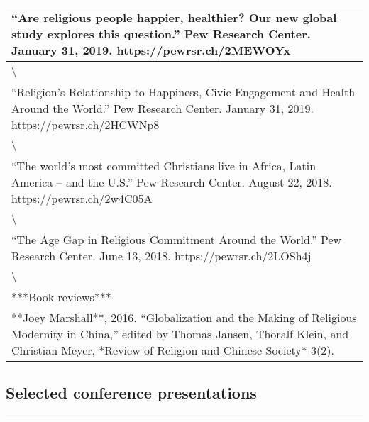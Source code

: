\documentclass[
]{article}
\begin{document}
\begin{tabular}{l}
\hline
“Are religious people happier, healthier? Our new global study explores this question.” Pew Research Center. January 31, 2019. https://pewrsr.ch/2MEWOYx\\
\hline
\textbackslash{}\\
\hline
“Religion’s Relationship to Happiness, Civic Engagement and Health Around the World.” Pew Research Center. January 31, 2019. https://pewrsr.ch/2HCWNp8\\
\hline
\textbackslash{}\\
\hline
“The world’s most committed Christians live in Africa, Latin America – and the U.S.” Pew Research Center. August 22, 2018. https://pewrsr.ch/2w4C05A\\
\hline
\textbackslash{}\\
\hline
“The Age Gap in Religious Commitment Around the World.” Pew Research Center. June 13, 2018. https://pewrsr.ch/2LOSh4j\\
\hline
\textbackslash{}\\
\hline
***Book reviews***\\
\hline
**Joey Marshall**, 2016. “Globalization and the Making of Religious Modernity in China,” edited by Thomas Jansen, Thoralf Klein, and Christian Meyer, *Review of Religion and Chinese Society* 3(2).\\
\hline
\end{tabular}

\hypertarget{selected-conference-presentations}{%
\subsection{Selected conference
presentations}\label{selected-conference-presentations}}

\begin{center}\rule{0.5\linewidth}{\linethickness}\end{center}
\end{document}

